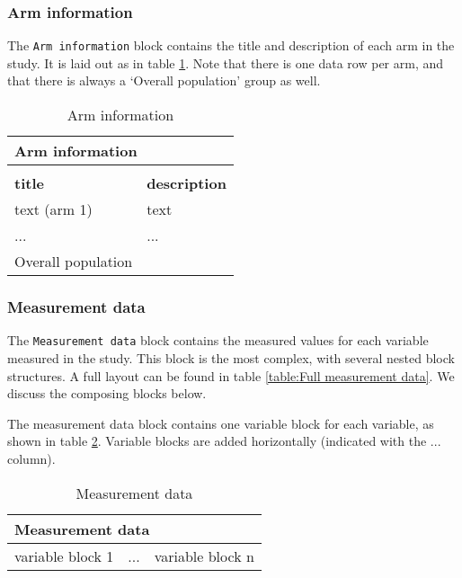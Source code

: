 \documentclass[a4paper,10pt]{article}
\begin{document}
\subsubsection{Arm information}
The \texttt{Arm information} block contains the title and description of each arm in the study. It is laid out as in table \ref{table:Arm information}. Note that there is one data row per arm, and that there is always a `Overall population' group as well.
\begin{table}[h!]
  \centering
  \caption{Arm information}
  \label{table:Arm information}
  \begin{tabular}{|l|l|}
    \hline
    \multicolumn{2}{|l|}{\textbf{Arm information}}  \\ \hline
    \multicolumn{2}{|l|}{}                          \\ \hline
    \textbf{title} & \textbf{description}           \\ \hline
    text (arm 1)& text                              \\ \hline
    ... & ...                                       \\ \hline
    Overall population&                             \\ \hline
  \end{tabular}
\end{table}

\subsubsection{Measurement data}
The \texttt{Measurement data} block contains the measured values for each variable measured in the study. This block is the most complex, with several nested block structures. A full layout can be found in table \ref{table:Full measurement data}. We discuss the composing blocks below.

The measurement data block contains one variable block for each variable, as shown in table \ref{table:Measurement data}. Variable blocks are added horizontally (indicated with the ... column). 

\begin{table}[h!]
  \centering
  \caption{Measurement data}
  \small
  \label{table:Measurement data}
  \begin{tabular}{|l|l|l|}
    \hline
    \multicolumn{3}{|l|}{\textbf{Measurement data}}  \\ \hline
    variable block 1 & ... & variable block n  \\ \hline
  \end{tabular}
\end{table}
\end{document}
